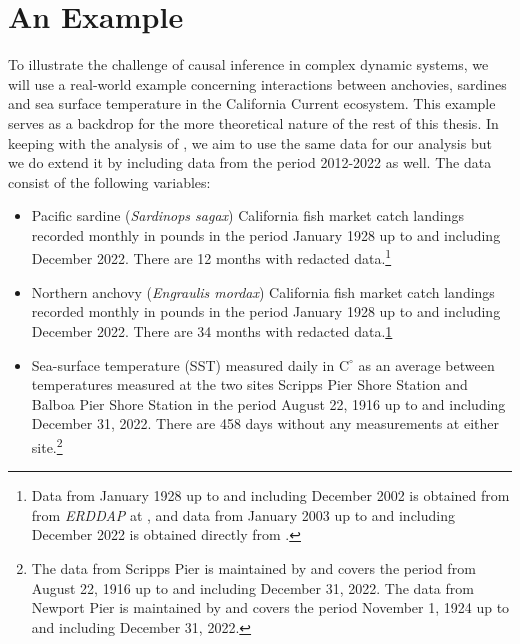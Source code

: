 \documentclass[11pt, a4paper]{memoir}
\theoremstyle{break}
\theoremstyle{break}
\theoremstyle{nonumberplain}
\begin{document}
\section*{An Example}
To illustrate the challenge of causal inference in complex dynamic systems, we will use a real-world example concerning interactions between anchovies, sardines and sea surface temperature in the California Current ecosystem. This example serves as a backdrop for the more theoretical nature of the rest of this thesis. In keeping with the analysis of \cite{Sugihara}, we aim to use the same data for our analysis but we do extend it by including data from the period 2012-2022 as well. The data consist of the following variables:
\begin{itemize}
\item Pacific sardine (\textit{Sardinops sagax}) California fish market catch landings recorded monthly in pounds in the period January 1928 up to and including December 2022. There are 12 months with redacted data.\footnote{\label{note1}Data from January 1928 up to and including December 2002 is obtained from from \textit{ERDDAP} at \cite{oldData}, and data from January 2003 up to and including December 2022 is obtained directly from \cite{newData}.}
\item Northern anchovy (\textit{Engraulis mordax}) California fish market catch landings recorded monthly in pounds in the period January 1928 up to and including December 2022. There are 34 months with redacted data.\cref{note1} 
\item  Sea-surface temperature (SST) measured daily in $\text{C}^\circ$ as an average between temperatures measured at the two sites Scripps Pier Shore Station and Balboa Pier Shore Station in the period August 22, 1916 up to and including December 31, 2022. There are 458 days without any measurements at either site.\footnote{The data from Scripps Pier is maintained by \cite{Scripps} and covers the period from August 22, 1916 up to and including December 31, 2022. The data from Newport Pier is maintained by \cite{Newport} and covers the period November 1, 1924 up to and including December 31, 2022.} 
\end{itemize}
\end{document}
